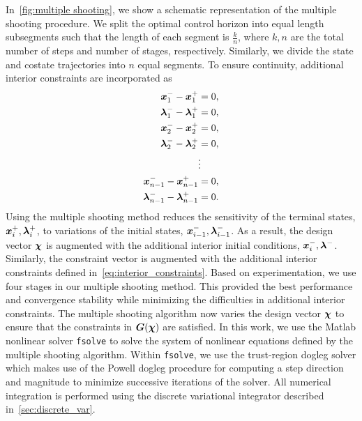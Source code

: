 \documentclass[smallcondensed]{svjour3}
\begin{document}
In~\cref{fig:multiple shooting}, we show a schematic representation of the multiple shooting procedure.
We split the optimal control horizon into equal length subsegments such that the length of each segment is \( \frac{k}{n} \), where \( k, n \) are the total number of steps and number of stages, respectively.
Similarly, we divide the state and costate trajectories into \( n \) equal segments. 
To ensure continuity, additional interior constraints are incorporated as
\begin{subequations}
\begin{align}\label{eq:interior_constraints}
        \bm{x}_1^{-} - \bm{x}_1^{+} &= 0 , \\ 
        \bm{\lambda}_1^{-} - \bm{\lambda}_1^{+} &= 0 , \\
        \bm{x}_2^{-} - \bm{x}_2^{+} &= 0 , \\ 
        \bm{\lambda}_2^{-} - \bm{\lambda}_2^{+} &= 0 , \\
        &\vdots \\
        \bm{x}_{n-1}^{-} - \bm{x}_{n-1}^{+} &= 0 , \\ 
        \bm{\lambda}_{n-1}^{-} - \bm{\lambda}_{n-1}^{+} &= 0.
\end{align}
\end{subequations}
Using the multiple shooting method reduces the sensitivity of the terminal states, \( \bm{x}_i^{+}, \bm{\lambda}_i^{+}\), to variations of the initial states, \(\bm{x}_{i-1}^{-}, \bm{\lambda}_{i-1}^{-}\).
As a result, the design vector \( \bm{\chi} \) is augmented with the additional interior initial conditions, \( \bm{x}_i^{-}, \bm{\lambda}^{-}\).
Similarly, the constraint vector is augmented with the additional interior constraints defined in~\cref{eq:interior_constraints}.
Based on experimentation, we use four stages in our multiple shooting method.
This provided the best performance and convergence stability while minimizing the difficulties in additional interior constraints.
The multiple shooting algorithm now varies the design vector \( \bm{\chi}\) to ensure that the constraints in \( \bm{G}(\bm{\chi}) \) are satisfied.
In this work, we use the Matlab nonlinear solver \texttt{fsolve} to solve the system of nonlinear equations defined by the multiple shooting algorithm.
Within \texttt{fsolve}, we use the trust-region dogleg solver which makes use of the Powell dogleg procedure for computing a step direction and magnitude to minimize successive iterations of the solver.
All numerical integration is performed using the discrete variational integrator described in~\cref{sec:discrete_var}.
\end{document}
